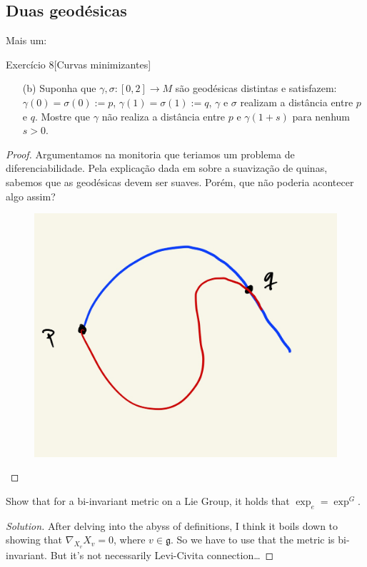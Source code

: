 \subsection{Duas geodésicas}
Mais um: 

\begin{thing4}{Exercício 8}[Curvas minimizantes]\label{exer:8}\leavevmode
\begin{enumerate}[label=(\alph*)]
	\item[(b)] Suponha que \(\gamma,\sigma:[0,2] \to M\) são geodésicas distintas e satisfazem: \(\gamma(0)=\sigma(0):=p\), \(\gamma(1)=\sigma(1):=q\), \(\gamma\) e \(\sigma\) realizam a distância entre \(p\) e \(q\). Mostre que \(\gamma\) não realiza a distância entre \(p\) e \(\gamma(1+s)\) para nenhum \(s>0\).
\end{enumerate}
\end{thing4}

\begin{proof}\leavevmode
Argumentamos na monitoria que teriamos um problema de diferenciabilidade. Pela explicação dada em  \cite{ler} sobre a suavização de quinas, sabemos que as geodésicas devem ser suaves. Porém, que não poderia acontecer algo assim?
\begin{figure}[H]
	\centering
	\includegraphics[width=.3\textwidth]{fig2}
\end{figure}
\end{proof}

\begin{exercise}\leavevmode
Show that for a bi-invariant metric on a Lie Group, it holds that \(\operatorname{exp}_e=\operatorname{exp}^G\).
\end{exercise}

\begin{proof}[Solution]\leavevmode
After delving into the abyss of definitions, I think it boils down to showing that \(\nabla_{X_v} X_v=0\), where \(v \in \mathfrak{g}\). So we have to use that the metric is bi-invariant. But it's not necessarily Levi-Civita connection…
\end{proof}

\clearpage

